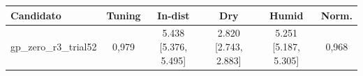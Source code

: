 \begin{tabular}{l c c c c c}
\hline
\textbf{Candidato} & \textbf{Tuning} & \textbf{In-dist} & \textbf{Dry} & \textbf{Humid} & \textbf{Norm.} \\ \hline
gp\_zero\_r3\_trial52 & 0,979 & 5.438 [5.376, 5.495] & 2.820 [2.743, 2.883] & 5.251 [5.187, 5.305] & 0,968 \\
\hline
\end{tabular}
